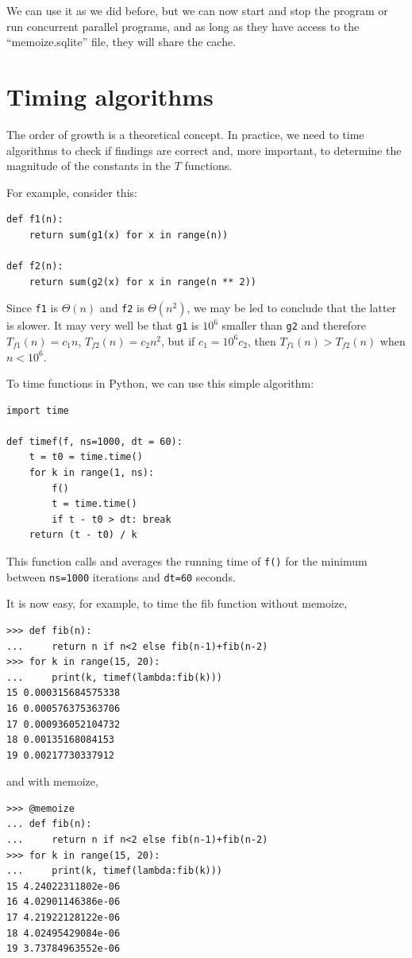 \documentclass[justified, sixbynine]{tufte-book}
\def\ft{\small\tt}
\theoremstyle{plain}%
\newtheorem * {corollary}{Corollary}
\theoremstyle{definition}
\theoremstyle{remark}
\newtheorem * {remark}{Remark}
\newtheorem * {note}{Note}
\begin{document}
\begin{fullwidth}
We can use it as we did before, but we can now start and stop the program or run concurrent parallel programs, and as long as they have access to the ``memoize.sqlite'' file, they will share the cache.


\goodbreak\section{Timing algorithms}

The order of growth is a theoretical concept. In practice, we need to time algorithms to check if findings are correct and, more important, to determine the magnitude of the constants in the $T$ functions.

For example, consider this:
\begin{lstlisting}
def f1(n):
    return sum(g1(x) for x in range(n))

def f2(n):
    return sum(g2(x) for x in range(n ** 2))
\end{lstlisting}


Since {\ft f1} is $\Theta(n)$ and {\ft f2} is $\Theta(n^2)$, we may be led to conclude that the latter is slower. It may very well be that {\ft g1} is $10^6$ smaller than {\ft g2} and therefore $T_{f1}(n) = c_1 n$, $T_{f2}(n) = c_2 n^2$, but if $c_1 = 10^6 c_2$, then $T_{f1}(n) > T_{f2}(n)$ when $n<10^6$.

To time functions in Python, we can use this simple algorithm:

\begin{lstlisting}
import time

def timef(f, ns=1000, dt = 60):
    t = t0 = time.time()
    for k in range(1, ns):
        f()
        t = time.time()
        if t - t0 > dt: break
    return (t - t0) / k
\end{lstlisting}

This function calls and averages the running time of {\ft f()} for the minimum between {\ft ns=1000} iterations and {\ft dt=60} seconds.

It is now easy, for example, to time the fib function without memoize, 
\begin{lstlisting}
>>> def fib(n):
...     return n if n<2 else fib(n-1)+fib(n-2)
>>> for k in range(15, 20):
...     print(k, timef(lambda:fib(k)))
15 0.000315684575338
16 0.000576375363706
17 0.000936052104732
18 0.00135168084153
19 0.00217730337912
\end{lstlisting}
and with memoize, 
\begin{lstlisting}
>>> @memoize
... def fib(n):
...     return n if n<2 else fib(n-1)+fib(n-2)
>>> for k in range(15, 20):
...     print(k, timef(lambda:fib(k)))
15 4.24022311802e-06
16 4.02901146386e-06
17 4.21922128122e-06
18 4.02495429084e-06
19 3.73784963552e-06
\end{lstlisting}


\end{fullwidth}
\end{document}
